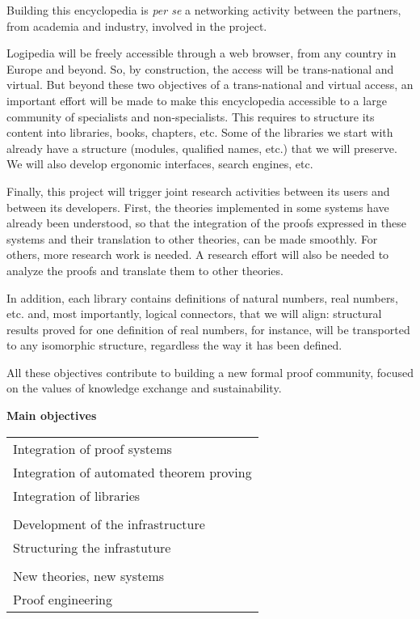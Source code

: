 Building this encyclopedia is {\em per se} a networking activity
between the partners, from academia and industry, involved in the
project.

Logipedia will be freely accessible through a web browser, from any
country in Europe and beyond. So, by construction, the access will be
trans-national and virtual. But beyond these two objectives of a
trans-national and virtual access, an important effort will be made to
make this encyclopedia accessible to a large community of specialists
and non-specialists. This requires to structure its content into
libraries, books, chapters, etc. Some of the libraries we start with
already have a structure (modules, qualified names, etc.) that we will
preserve. We will also develop ergonomic interfaces, search engines,
etc.

Finally, this project will trigger joint research activities between
its users and between its developers.  First, the theories implemented
in some systems have already been understood, so that the integration
of the proofs expressed in these systems and their translation to
other theories, can be made smoothly. For others, more research work
is needed. A research effort will also be needed to analyze the proofs and
translate them to other theories. 

In addition, each library contains definitions of natural numbers,
real numbers, etc. and, most importantly, logical connectors, that
we will align: structural results proved for one definition of real
numbers, for instance, will be transported to any isomorphic structure, 
regardless the way it has been defined.

All these objectives contribute to building a new formal proof
community, focused on the values of knowledge exchange and
sustainability.


\newpage

\begin{framed}
\begin{center}
{\bf Main objectives}
\end{center}

\begin{tabular}{l}
  Integration of proof systems\\
  Integration of automated theorem proving\\
  Integration of libraries\\
  \\
  Development of the infrastructure\\
  Structuring the infrastuture\\
  \\
  New theories, new systems\\
  Proof engineering\\
\end{tabular}
\end{framed}


